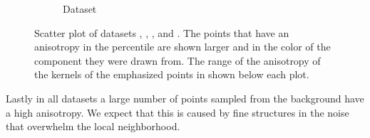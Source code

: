 \begin{figure}
\begin{subfigure}{0.23\textwidth}
					\caption{Dataset \baakmanThree}
					\label{fig:discussion:anisotropy:baakman3}
				\end{subfigure}			
				\caption{Scatter plot of datasets
					 \ferdosiTwo, %
					 \baakmanTwo, %
					 \ferdosiThree, and %
					 \baakmanThree. %
					The points that have an anisotropy in the  percentile are shown larger and in the color of the component they were drawn from. The range of the anisotropy of the kernels of the emphasized points in shown below each plot.}
				\label{fig:discussion:anisotropy:multisphere}
			\end{figure}			

		Lastly in all datasets a large number of points sampled from the background have a high anisotropy. We expect that this is caused by fine structures in the noise that overwhelm the local neighborhood.



